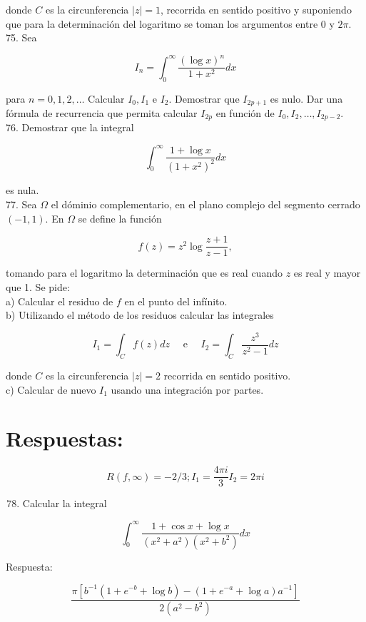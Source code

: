 \documentclass[10pt]{article}
\theoremstyle{plain}
\theoremstyle{definition}
\theoremstyle{remark}
\begin{document}
donde $C$ es la circunferencia $|z|=1$, recorrida en sentido positivo y suponiendo que para la determinación del logaritmo se toman los argumentos entre 0 y $2 \pi$.\\
75. Sea

$$
I_{n}=\int_{0}^{\infty} \frac{(\log x)^{n}}{1+x^{2}} d x
$$

para $n=0,1,2, \ldots$ Calcular $I_{0}, I_{1}$ e $I_{2}$. Demostrar que $I_{2 p+1}$ es nulo. Dar una fórmula de recurrencia que permita calcular $I_{2 p}$ en función de $I_{0}, I_{2}, \ldots, I_{2 p-2}$.\\
76. Demostrar que la integral

$$
\int_{0}^{\infty} \frac{1+\log x}{\left(1+x^{2}\right)^{2}} d x
$$

es nula.\\
77. Sea $\Omega$ el dóminio complementario, en el plano complejo del segmento cerrado $(-1,1)$. En $\Omega$ se define la función

$$
f(z)=z^{2} \log \frac{z+1}{z-1},
$$

tomando para el logaritmo la determinación que es real cuando $z$ es real y mayor que 1. Se pide:\\
a) Calcular el residuo de $f$ en el punto del infínito.\\
b) Utilizando el método de los residuos calcular las integrales

$$
I_{1}=\int_{C} f(z) d z \quad \text { e } \quad I_{2}=\int_{C} \frac{z^{3}}{z^{2}-1} d z
$$

donde $C$ es la circunferencia $|z|=2$ recorrida en sentido positivo.\\
c) Calcular de nuevo $I_{1}$ usando una integración por partes.

\section*{Respuestas:}
$$
R(f, \infty)=-2 / 3 ; I_{1}=\frac{4 \pi i}{3} I_{2}=2 \pi i
$$

\begin{enumerate}
  \setcounter{enumi}{77}
  \item Calcular la integral
\end{enumerate}

$$
\int_{0}^{\infty} \frac{1+\cos x+\log x}{\left(x^{2}+a^{2}\right)\left(x^{2}+b^{2}\right)} d x
$$

Respuesta:

$$
\frac{\pi\left[b^{-1}\left(1+e^{-b}+\log b\right)-\left(1+e^{-a}+\log a\right) a^{-1}\right]}{2\left(a^{2}-b^{2}\right)}
$$
\end{document}
